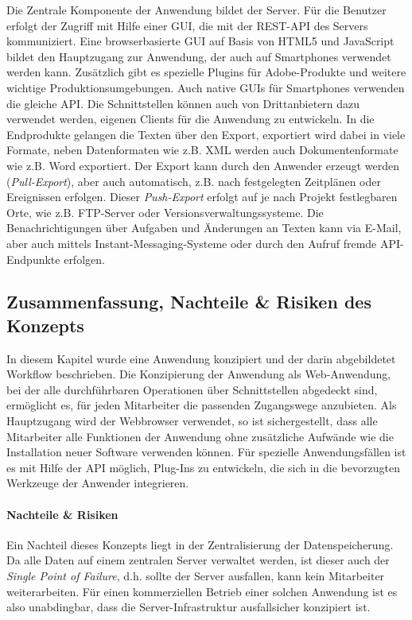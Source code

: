 Die Zentrale Komponente der Anwendung bildet der Server. Für die Benutzer erfolgt der Zugriff mit Hilfe einer GUI, die mit der REST-API des Servers kommuniziert. Eine browserbasierte GUI auf Basis von HTML5 und JavaScript bildet den Hauptzugang zur Anwendung, der auch auf Smartphones verwendet werden kann. Zusätzlich gibt es spezielle Plugins für Adobe-Produkte und weitere wichtige Produktionsumgebungen. Auch native GUIs für Smartphones verwenden die gleiche API. Die Schnittstellen können auch von Drittanbietern dazu verwendet werden, eigenen Clients für die Anwendung zu entwickeln. In die Endprodukte gelangen die Texten über den Export, exportiert wird dabei in viele Formate, neben Datenformaten wie z.B. XML werden auch Dokumentenformate wie z.B. Word exportiert. Der Export kann durch den Anwender erzeugt werden (\emph{Pull-Export}), aber auch automatisch, z.B. nach festgelegten Zeitplänen oder Ereignissen erfolgen. Dieser \emph{Push-Export} erfolgt auf je nach Projekt festlegbaren Orte, wie z.B. FTP-Server oder Versionsverwaltungssysteme. Die Benachrichtigungen über Aufgaben und Änderungen an Texten kann via E-Mail, aber auch mittels Instant-Messaging-Systeme oder durch den Aufruf fremde API-Endpunkte erfolgen.

\pagebreak

\subsection{Zusammenfassung, Nachteile \& Risiken des Konzepts}

In diesem Kapitel wurde eine Anwendung konzipiert und der darin abgebildetet Workflow beschrieben. Die Konzipierung der Anwendung als Web-Anwendung, bei der alle durchführbaren Operationen über Schnittstellen abgedeckt sind, ermöglicht es, für jeden Mitarbeiter die passenden Zugangswege anzubieten. Als Hauptzugang wird der Webbrowser verwendet, so ist sichergestellt, dass alle Mitarbeiter alle Funktionen der Anwendung ohne zusätzliche Aufwände wie die Installation neuer Software verwenden können. Für spezielle Anwendungsfällen ist es mit Hilfe der API möglich, Plug-Ins zu entwickeln, die sich in die bevorzugten Werkzeuge der Anwender integrieren.

\paragraph{Nachteile \& Risiken} Ein Nachteil dieses Konzepts liegt in der Zentralisierung der Datenspeicherung. Da alle Daten auf einem zentralen Server verwaltet werden, ist dieser auch der \emph{Single Point of Failure}, d.h. sollte der Server ausfallen, kann kein Mitarbeiter weiterarbeiten. Für einen kommerziellen Betrieb einer solchen Anwendung ist es also unabdingbar, dass die Server-Infrastruktur ausfallsicher konzipiert ist. 

